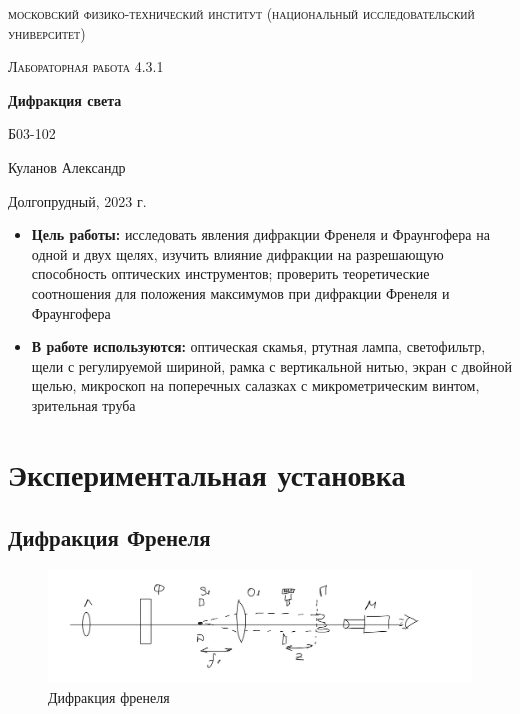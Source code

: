 \documentclass[a4paper, 12pt]{article}
\begin{document}
\begin{titlepage}
	\centering
	\vspace{5cm}
	{\scshape\LARGE московский физико-технический институт (национальный исследовательский университет) \par}
	\vspace{6cm}
	{\scshape\Large Лабораторная работа 4.3.1 \par}
	{\huge\bfseries Дифракция света \par}
	\vspace{1cm}
	\vfill
\begin{flushright}
	{\large Б03-102}\par
	\vspace{0.3cm}
	{\LARGE Куланов Александр}
\end{flushright}
	

	\vfill


	Долгопрудный, 2023 г.
\end{titlepage}

\begin{itemize}
	\item \textbf{Цель работы:} исследовать явления дифракции Френеля и Фраунгофера на одной и двух щелях, изучить влияние дифракции на разрешающую способность оптических инструментов; проверить теоретические соотношения для положения максимумов при дифракции Френеля и Фраунгофера
    \item \textbf{В работе используются:} оптическая скамья, ртутная лампа, светофильтр, щели с регулируемой шириной, рамка с вертикальной нитью, экран с двойной щелью, микроскоп на поперечных салазках с микрометрическим винтом, зрительная труба
\end{itemize}

\section{Экспериментальная установка}
\subsection*{Дифракция Френеля}

\begin{figure}[H]
    \centering
    \includegraphics[width=1\textwidth]{frenel.jpg}
    \caption{Дифракция френеля}
    \label{fig:ris1}
\end{figure}
\end{document}
